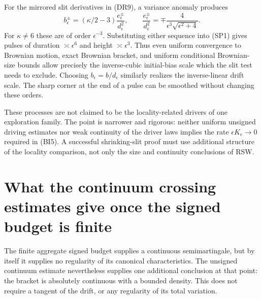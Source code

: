 \documentclass[11pt]{article}
\theoremstyle{definition}\newtheorem{definition}[theorem]{Definition}
\theoremstyle{remark}\newtheorem{remark}[theorem]{Remark}
\begin{document}
For the mirrored slit derivatives in (DR9), a variance anomaly produces
\[
 b_\epsilon^\pm=(\kappa/2-3)\frac{e_\epsilon^\pm}{d_\epsilon^2},
 \qquad
 \frac{e_\epsilon^\pm}{d_\epsilon^2}
 =\mp\frac4{\epsilon^3\sqrt{\epsilon^2+4}}.
 \tag{SP3}
\]
For $\kappa\ne6$ these are of order $\epsilon^{-3}$. Substituting either
sequence into (SP1) gives pulses of duration $\asymp\epsilon^6$ and
height $\asymp\epsilon^3$. Thus even uniform convergence to Brownian
motion, exact Brownian bracket, and uniform conditional Brownian-size
bounds allow precisely the inverse-cubic initial-bias scale which the
slit test needs to exclude. Choosing $b_\epsilon=b/d_\epsilon$ similarly
realizes the inverse-linear drift scale. The sharp corner at the end
of a pulse can be smoothed without changing these orders.

These processes are not claimed to be the locality-related drivers of
one exploration family. The point is narrower and rigorous: neither
uniform unsigned driving estimates nor weak continuity of the driver
laws implies the rate $\epsilon K_\epsilon\to0$ required in (BI5).
A successful shrinking-slit proof must use additional structure of the
locality comparison, not only the size and continuity conclusions of RSW.


\section{What the continuum crossing estimates give once the signed budget is finite}
\label{sec:bracket-from-crossing-moments}

The finite aggregate signed budget supplies a continuous
semimartingale, but by itself it supplies no regularity of its canonical
characteristics. The unsigned continuum estimate nevertheless supplies
one additional conclusion at that point: the bracket is absolutely
continuous with a bounded density. This does not require a tangent of
the drift, or any regularity of its total variation.
\end{document}
